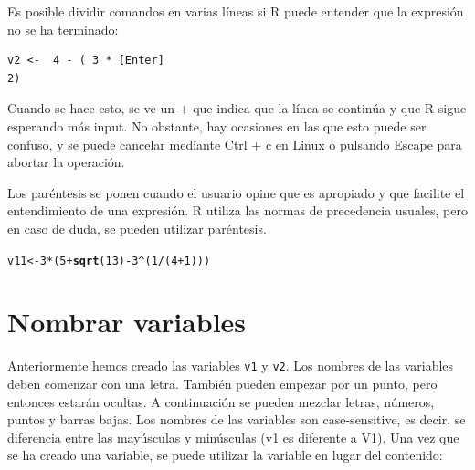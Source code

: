 \documentclass{config/apuntes}\usepackage[]{graphicx}\usepackage[]{xcolor}
\makeatletter
\newcommand{\hlnum}[1]{\textcolor[rgb]{0.686,0.059,0.569}{#1}}%
\newcommand{\hlopt}[1]{\textcolor[rgb]{0,0,0}{#1}}%
\newcommand{\hldef}[1]{\textcolor[rgb]{0.345,0.345,0.345}{#1}}%
\newcommand{\hlkwb}[1]{\textcolor[rgb]{0.69,0.353,0.396}{#1}}%
\newcommand{\hlkwd}[1]{\textcolor[rgb]{0.737,0.353,0.396}{\textbf{#1}}}%
\newenvironment{kframe}{%
 \def\at@end@of@kframe{}%
 \ifinner\ifhmode%
  \def\at@end@of@kframe{\end{minipage}}%
  \begin{minipage}{\columnwidth}%
 \fi\fi%
 \def\FrameCommand##1{\hskip\@totalleftmargin \hskip-\fboxsep
 \colorbox{shadecolor}{##1}\hskip-\fboxsep
     \hskip-\linewidth \hskip-\@totalleftmargin \hskip\columnwidth}%
 \MakeFramed {\advance\hsize-\width
   \@totalleftmargin\z@ \linewidth\hsize
   \@setminipage}}%
 {\par\unskip\endMakeFramed%
 \at@end@of@kframe}
\newenvironment{knitrout}{}{} %
\newcommand{\code}[1]{\texttt{#1}}
\makeatother
\begin{document}
Es posible dividir comandos en varias líneas si R puede entender que la expresión no se ha terminado: 
\begin{verbatim}
v2 <-  4 - ( 3 * [Enter]
2)
\end{verbatim}

Cuando se hace esto, se ve un + que indica que la línea se continúa y que R sigue esperando más input. No obstante, hay ocasiones en las que esto puede ser confuso, y se puede cancelar mediante Ctrl + c en Linux o pulsando Escape para abortar la operación. 

Los paréntesis se ponen cuando el usuario opine que es apropiado y que facilite el entendimiento de una expresión. R utiliza las normas de precedencia usuales, pero en caso de duda, se pueden utilizar paréntesis.

\begin{knitrout}
\color{fgcolor}\begin{kframe}
\begin{alltt}
\hldef{v11} \hlkwb{<-} \hlnum{3} \hlopt{*} \hldef{(} \hlnum{5} \hlopt{+} \hlkwd{sqrt}\hldef{(}\hlnum{13}\hldef{)} \hlopt{-} \hlnum{3}\hlopt{^}\hldef{(}\hlnum{1}\hlopt{/}\hldef{(}\hlnum{4} \hlopt{+} \hlnum{1}\hldef{)))}
\end{alltt}
\end{kframe}
\end{knitrout}

\section{Nombrar variables}
Anteriormente hemos creado las variables \code{v1} y \code{v2}. Los nombres de las variables deben comenzar con una letra. También pueden empezar por un punto, pero entonces estarán ocultas. A continuación se pueden mezclar letras, números, puntos y barras bajas. Los nombres de las variables son case-sensitive, es decir, se diferencia entre las mayúsculas y minúsculas (v1 es diferente a V1). Una vez que se ha creado una variable, se puede utilizar la variable en lugar del contenido:
\end{document}
